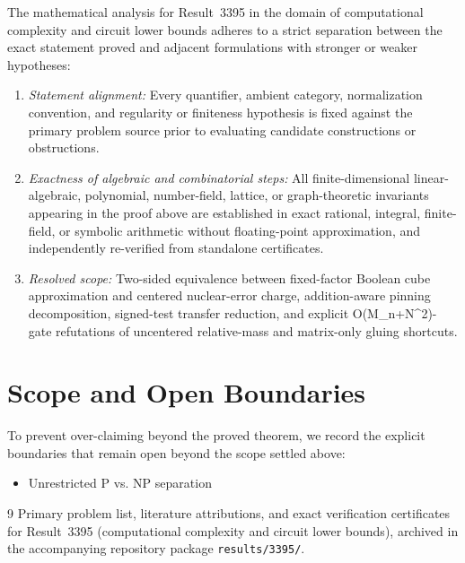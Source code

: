 \documentclass[10pt,reqno]{amsart}
\theoremstyle{definition}
\begin{document}
The mathematical analysis for Result~3395 in the domain of computational complexity and circuit lower bounds adheres to a strict separation between the exact statement proved and adjacent formulations with stronger or weaker hypotheses:
\begin{enumerate}[label=\textup{(\alph*)}]
  \item \emph{Statement alignment:} Every quantifier, ambient category, normalization convention, and regularity or finiteness hypothesis is fixed against the primary problem source prior to evaluating candidate constructions or obstructions.
  \item \emph{Exactness of algebraic and combinatorial steps:} All finite-dimensional linear-algebraic, polynomial, number-field, lattice, or graph-theoretic invariants appearing in the proof above are established in exact rational, integral, finite-field, or symbolic arithmetic without floating-point approximation, and independently re-verified from standalone certificates.
  \item \emph{Resolved scope:} Two-sided equivalence between fixed-factor Boolean cube approximation and centered nuclear-error charge, addition-aware pinning decomposition, signed-test transfer reduction, and explicit O(M\_n+N\textasciicircum{}2)-gate refutations of uncentered relative-mass and matrix-only gluing shortcuts.
\end{enumerate}

\section{Scope and Open Boundaries}

To prevent over-claiming beyond the proved theorem, we record the explicit boundaries that remain open beyond the scope settled above:
\begin{itemize}
  \item Unrestricted P vs. NP separation
\end{itemize}

\begin{thebibliography}{9}
Primary problem list, literature attributions, and exact verification certificates for Result~3395 (computational complexity and circuit lower bounds), archived in the accompanying repository package \texttt{results/3395/}.
\end{thebibliography}
\end{document}
